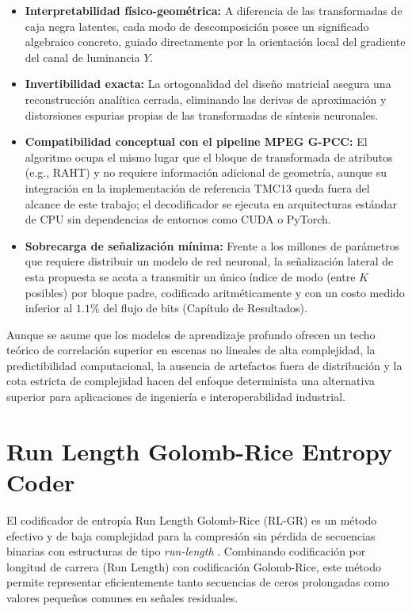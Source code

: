     \begin{itemize}
        \item \textbf{Interpretabilidad físico-geométrica:} A diferencia de las transformadas de caja negra latentes, cada modo de descomposición posee un significado algebraico concreto, guiado directamente por la orientación local del gradiente del canal de luminancia $Y$.
        \item \textbf{Invertibilidad exacta:} La ortogonalidad del diseño matricial asegura una reconstrucción analítica cerrada, eliminando las derivas de aproximación y distorsiones espurias propias de las transformadas de síntesis neuronales.
        \item \textbf{Compatibilidad conceptual con el pipeline MPEG G-PCC:} El algoritmo ocupa el mismo lugar que el bloque de transformada de atributos (e.g., RAHT) y no requiere información adicional de geometría, aunque su integración en la implementación de referencia TMC13 queda fuera del alcance de este trabajo; el decodificador se ejecuta en arquitecturas estándar de CPU sin dependencias de entornos como CUDA o PyTorch.
        \item \textbf{Sobrecarga de señalización mínima:} Frente a los millones de parámetros que requiere distribuir un modelo de red neuronal, la señalización lateral de esta propuesta se acota a transmitir un único índice de modo (entre $K$ posibles) por bloque padre, codificado aritméticamente y con un costo medido inferior al $1.1\%$ del flujo de bits (Capítulo de Resultados).
    \end{itemize}
    Aunque se asume que los modelos de aprendizaje profundo ofrecen un techo teórico de correlación superior en escenas no lineales de alta complejidad, la predictibilidad computacional, la ausencia de artefactos fuera de distribución y la cota estricta de complejidad hacen del enfoque determinista una alternativa superior para aplicaciones de ingeniería e interoperabilidad industrial.

\section{Run Length Golomb-Rice Entropy Coder}\label{sec: rlgr}

El codificador de entropía Run Length Golomb-Rice (RL-GR) es un método efectivo y de
baja complejidad para la compresión sin pérdida de secuencias binarias con estructuras de
tipo \textit{run-length} \cite{malvar2006adaptive,sayood2006introduction}. Combinando
codificación por longitud de carrera (Run Length) con codificación Golomb-Rice, este
método permite representar eficientemente tanto secuencias de ceros prolongadas como
valores pequeños comunes en señales residuales.

